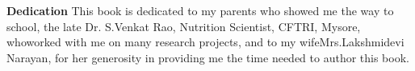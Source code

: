 \thispagestyle{empty}


\vspace*{\fill}
\begingroup
\centering
{\Huge\textbf{Dedication}}
\vskip 10pt
This book is dedicated to my parents who showed me the 
 way to school, the late Dr. S.Venkat Rao, Nutrition Scientist, CFTRI, Mysore, who\break worked with me on many research projects, and to my wife\break Mrs.Lakshmidevi Narayan, for her generosity in providing me the time needed to author this book.
 \endgroup
\vspace*{\fill}
